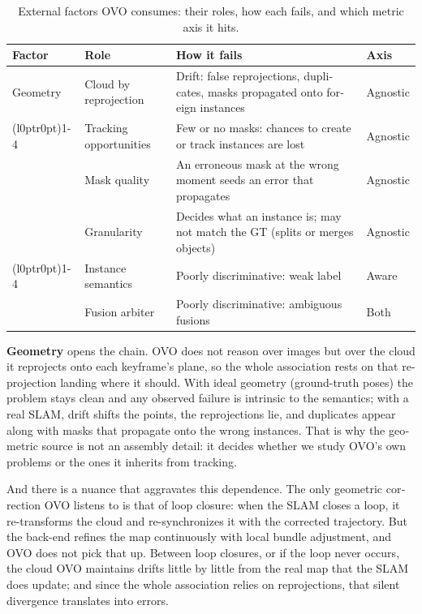 \begin{otherlanguage}{english}
\begin{table}[h!]
  \centering
  \small
  \setlength{\tabcolsep}{8pt}
  \renewcommand{\arraystretch}{1.15}
  \begin{tabular}{@{}l >{\raggedright\arraybackslash}p{3.5cm} >{\raggedright\arraybackslash}p{5.9cm} l@{}}
    \toprule
    \textbf{Factor} & \textbf{Role} & \textbf{How it fails} & \textbf{Axis} \\
    \midrule
    Geometry & Cloud by reprojection & Drift: false reprojections, duplicates, masks propagated onto foreign instances & Agnostic \\
    \cmidrule(l{0pt}r{0pt}){1-4}
    \multirow{3}{*}{Segmenter}
      & Tracking opportunities & Few or no masks: chances to create or track instances are lost & Agnostic \\
      & Mask quality           & An erroneous mask at the wrong moment seeds an error that propagates & Agnostic \\
      & Granularity            & Decides what an instance is; may not match the GT (splits or merges objects) & Agnostic \\
    \cmidrule(l{0pt}r{0pt}){1-4}
    \multirow{2}{*}{Descriptor}
      & Instance semantics & Poorly discriminative: weak label & Aware \\
      & Fusion arbiter     & Poorly discriminative: ambiguous fusions & Both \\
    \bottomrule
  \end{tabular}
  \caption{External factors OVO consumes: their roles, how each fails, and which metric axis it hits.}
  \label{tab:factors_external}
\end{table}

\textbf{Geometry} opens the chain. OVO does not reason over images but over the cloud it reprojects
onto each keyframe's plane, so the whole association rests on that reprojection landing where it
should. With ideal geometry (ground-truth poses) the problem stays clean and any observed failure is
intrinsic to the semantics; with a real SLAM, drift shifts the points, the reprojections lie, and
duplicates appear along with masks that propagate onto the wrong instances. That is why the geometric
source is not an assembly detail: it decides whether we study OVO's own problems or the ones it
inherits from tracking.

And there is a nuance that aggravates this dependence. The only geometric correction OVO listens to
is that of loop closure: when the SLAM closes a loop, it re-transforms the cloud and re-synchronizes
it with the corrected trajectory. But the back-end refines the map continuously with local bundle
adjustment, and OVO does not pick that up. Between loop closures, or if the loop never occurs, the
cloud OVO maintains drifts little by little from the real map that the SLAM does update; and since the
whole association relies on reprojections, that silent divergence translates into errors.


\end{otherlanguage}
